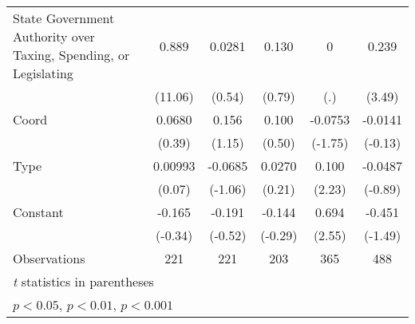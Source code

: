 {\begin{tabular*}{\linewidth}{@{\hskip\tabcolsep\extracolsep\fill}l*{5}{c}}
\addlinespace
State Government Authority over Taxing, Spending, or Legislating&    0.889\sym{***}&   0.0281         &    0.130         &        0         &    0.239\sym{**} \\
                &  (11.06)         &   (0.54)         &   (0.79)         &      (.)         &   (3.49)         \\
\addlinespace
Coord           &   0.0680         &    0.156         &    0.100         &  -0.0753         &  -0.0141         \\
                &   (0.39)         &   (1.15)         &   (0.50)         &  (-1.75)         &  (-0.13)         \\
\addlinespace
Type            &  0.00993         &  -0.0685         &   0.0270         &    0.100\sym{*}  &  -0.0487         \\
                &   (0.07)         &  (-1.06)         &   (0.21)         &   (2.23)         &  (-0.89)         \\
\addlinespace
Constant        &   -0.165         &   -0.191         &   -0.144         &    0.694\sym{*}  &   -0.451         \\
                &  (-0.34)         &  (-0.52)         &  (-0.29)         &   (2.55)         &  (-1.49)         \\
\midrule
Observations    &      221         &      221         &      203         &      365         &      488         \\
\bottomrule
\multicolumn{6}{l}{\footnotesize \textit{t} statistics in parentheses}\\
\multicolumn{6}{l}{\footnotesize \sym{*} \(p<0.05\), \sym{**} \(p<0.01\), \sym{***} \(p<0.001\)}\\
\end{tabular*}
}
